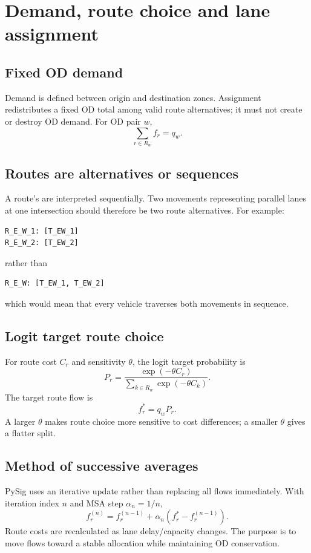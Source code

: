 \chapter{Demand, route choice and lane assignment}
\label{chap:demand-assignment}

\section{Fixed OD demand}
Demand is defined between origin and destination zones.  Assignment redistributes a
fixed OD total among valid route alternatives; it must not create or destroy OD demand.
For OD pair $w$,
\begin{equation}
\sum_{r\in R_w}f_r=q_w.
\end{equation}

\section{Routes are alternatives or sequences}
A route's  are interpreted sequentially.  Two movements representing
parallel lanes at one intersection should therefore be two route alternatives.  For
example:

\begin{verbatim}
R_E_W_1: [T_EW_1]
R_E_W_2: [T_EW_2]
\end{verbatim}

rather than
\begin{verbatim}
R_E_W: [T_EW_1, T_EW_2]
\end{verbatim}
which would mean that every vehicle traverses both movements in sequence.

\section{Logit target route choice}
For route cost $C_r$ and sensitivity $\theta$, the logit target probability is
\begin{equation}
P_r=\frac{\exp(-\theta C_r)}{\sum_{k\in R_w}\exp(-\theta C_k)}.
\end{equation}
The target route flow is
\begin{equation}
f_r^*=q_wP_r.
\end{equation}
A larger $\theta$ makes route choice more sensitive to cost differences; a smaller
$\theta$ gives a flatter split.

\section{Method of successive averages}
PySig uses an iterative update rather than replacing all flows immediately.  With
iteration index $n$ and MSA step $\alpha_n=1/n$,
\begin{equation}
f_r^{(n)}=f_r^{(n-1)}+\alpha_n\left(f_r^*-f_r^{(n-1)}\right).
\end{equation}
Route costs are recalculated as lane delay/capacity changes.  The purpose is to move
flows toward a stable allocation while maintaining OD conservation.


